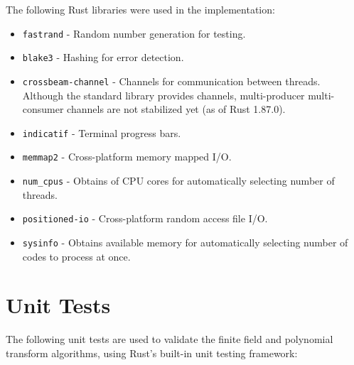 \label{appendix:dependencies}

The following Rust libraries were used in the implementation:

\begin{itemize}
    \item \texttt{fastrand} - Random number generation for testing.
    \item \texttt{blake3} - Hashing for error detection.
    \item \texttt{crossbeam-channel} - Channels for communication between threads. Although the standard library provides channels, multi-producer multi-consumer channels are not stabilized yet (as of Rust 1.87.0).
    \item \texttt{indicatif} - Terminal progress bars.
    \item \texttt{memmap2} - Cross-platform memory mapped I/O.
    \item \texttt{num\_cpus} - Obtains of CPU cores for automatically selecting number of threads.
    \item \texttt{positioned-io} - Cross-platform random access file I/O.
    \item \texttt{sysinfo} - Obtains available memory for automatically selecting number of codes to process at once.
\end{itemize}

\section{Unit Tests}

\label{appendix:unit}

The following unit tests are used to validate the finite field and polynomial transform algorithms, using Rust's built-in unit testing framework:

